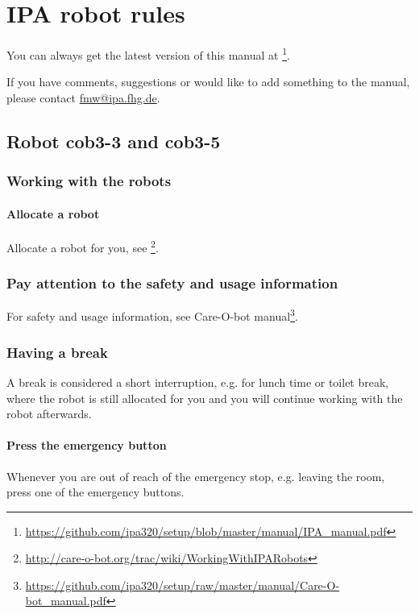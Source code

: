 \chapter{IPA robot rules}\label{chap:robot-rules}
You can always get the latest version of this manual at \footnote{\url{https://github.com/ipa320/setup/blob/master/manual/IPA_manual.pdf}}.

If you have comments, suggestions or would like to add something to the manual, please contact \href{mailto:fmw@ipa.fhg.de}{fmw@ipa.fhg.de}.

\section{Robot cob3-3 and cob3-5}

\subsection{Working with the robots}

\subsubsection{Allocate a robot}
Allocate a robot for you, see \footnote{\url{http://care-o-bot.org/trac/wiki/WorkingWithIPARobots}}. 

\subsection{Pay attention to the safety and usage information}
For safety and usage information, see Care-O-bot manual\footnote{\url{https://github.com/ipa320/setup/raw/master/manual/Care-O-bot_manual.pdf}}.

\subsection{Having a break}
A break is considered a short interruption, e.g. for lunch time or toilet break, where the robot is still allocated for you and you will continue working with the robot afterwards.

\subsubsection{Press the emergency button}
Whenever you are out of reach of the emergency stop, e.g. leaving the room, press one of the emergency buttons.

